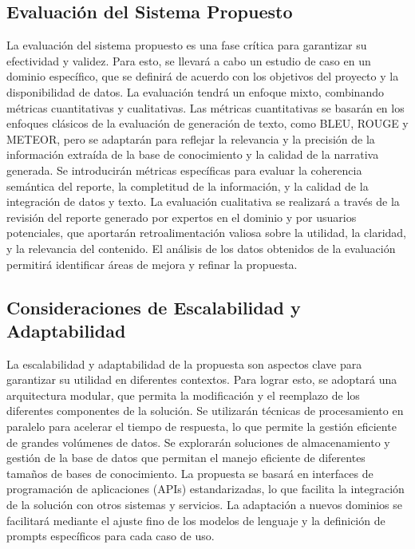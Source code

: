 \subsection{Evaluación del Sistema Propuesto}

La evaluación del sistema propuesto es una fase crítica para garantizar su efectividad y validez. Para esto, se llevará a cabo un estudio de caso en un dominio específico, que se definirá de acuerdo con los objetivos del proyecto y la disponibilidad de datos. La evaluación tendrá un enfoque mixto, combinando métricas cuantitativas y cualitativas. Las métricas cuantitativas se basarán en los enfoques clásicos de la evaluación de generación de texto, como BLEU, ROUGE y METEOR, pero se adaptarán para reflejar la relevancia y la precisión de la información extraída de la base de conocimiento y la calidad de la narrativa generada. Se introducirán métricas específicas para evaluar la coherencia semántica del reporte, la completitud de la información, y la calidad de la integración de datos y texto. La evaluación cualitativa se realizará a través de la revisión del reporte generado por expertos en el dominio y por usuarios potenciales, que aportarán retroalimentación valiosa sobre la utilidad, la claridad, y la relevancia del contenido. El análisis de los datos obtenidos de la evaluación permitirá identificar áreas de mejora y refinar la propuesta.


\subsection{Consideraciones de Escalabilidad y Adaptabilidad}

La escalabilidad y adaptabilidad de la propuesta son aspectos clave para garantizar su utilidad en diferentes contextos. Para lograr esto, se adoptará una arquitectura modular, que permita la modificación y el reemplazo de los diferentes componentes de la solución. Se utilizarán técnicas de procesamiento en paralelo para acelerar el tiempo de respuesta, lo que permite la gestión eficiente de grandes volúmenes de datos.
Se explorarán soluciones de almacenamiento y gestión de la base de datos que permitan el manejo eficiente de diferentes tamaños de bases de conocimiento. La propuesta se basará en interfaces de programación de aplicaciones (APIs) estandarizadas, lo que facilita la integración de la solución con otros sistemas y servicios. La adaptación a nuevos dominios se facilitará mediante el ajuste fino de los modelos de lenguaje y la definición de prompts específicos para cada caso de uso.

